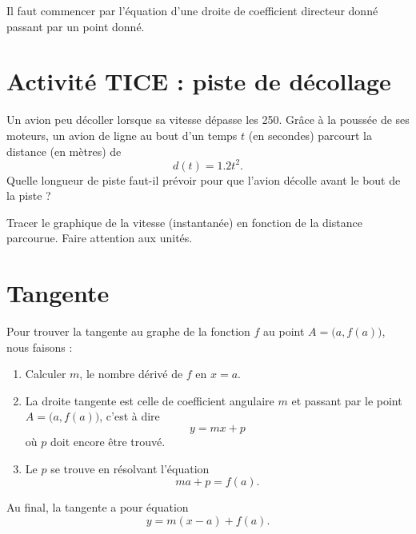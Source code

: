 
Il faut commencer par l'équation d'une droite de coefficient directeur donné passant par un point donné.

\section{Activité TICE : piste de décollage}

Un avion peu décoller lorsque sa vitesse dépasse les \unit{250}{\kilo\meter\per\hour}. Grâce à la poussée de ses moteurs, un avion de ligne au bout d'un temps \( t\) (en secondes) parcourt la distance (en mètres) de 
\begin{equation}
    d(t)=1.2t^2.
\end{equation}
Quelle longueur de piste faut-il prévoir pour que l'avion décolle avant le bout de la piste ?

Tracer le graphique de la vitesse (instantanée) en fonction de la distance parcourue. Faire attention aux unités.

\section{Tangente}

\begin{Aretenir}
    Pour trouver la tangente au graphe de la fonction \( f\) au point \( A=\big( a,f(a) \big)\), nous faisons :
    \begin{enumerate}
        \item
            Calculer \( m\), le nombre dérivé de $f$ en \( x=a\).
        \item
            La droite tangente est celle de coefficient angulaire \( m\) et passant par le point \( A=\big( a,f(a) \big)\), c'est à dire
            \begin{equation}
                y=mx+p
            \end{equation}
            où \( p\) doit encore être trouvé.
        \item
            Le \( p\) se trouve en résolvant l'équation
            \begin{equation}
                ma+p=f(a).
            \end{equation}
    \end{enumerate}
    Au final, la tangente a pour équation
    \begin{equation}
        y=m(x-a)+f(a).
    \end{equation}
\end{Aretenir}

